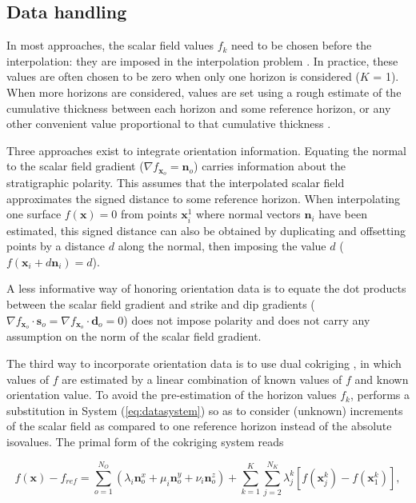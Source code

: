 \documentclass[preprint]{ring20}
\newcommand{\bx}{\mathbf{x}}
\newcommand{\bn}{\mathbf{n}}
\begin{document}
\subsection {Data handling}

In most approaches, the scalar field values $f_k$ need to be chosen before the interpolation: they are imposed in the interpolation problem \citep[e.g., ][]{Frank2007CG,Hillier2014MG,Renaudeau2019MG,Irakarama2022CD}. In practice, these values are often chosen to be zero when only one horizon is considered ($K$ = 1). When more horizons are considered, values are set using a rough estimate of the cumulative thickness between each horizon and some reference horizon, or any other convenient value proportional to that cumulative thickness \citep{Caumon2013GaRSITo,Collon-Drouaillet2015C&G,Collon2016I}. 

Three approaches exist to integrate orientation information. Equating the normal to the scalar field gradient ($\nabla f_{\bx_o} = \mathbf{n}_o$) carries information about the stratigraphic polarity. This assumes that the interpolated scalar field approximates the signed distance to some reference horizon. When interpolating one surface $f(\bx) = 0$ from points $\bx^1_i$ where normal vectors $\mathbf{n}_i$ have been estimated, this signed distance can also be obtained by duplicating and offsetting points by a distance $d$ along the normal, then imposing the value $d$ ($f(\bx_i + d \mathbf{n}_i) = d$). 

A less informative way of honoring orientation data is to equate the dot products between the scalar field gradient and strike and dip gradients ($\nabla f_{\bx_o} \cdot \mathbf{s}_o = \nabla f_{\bx_o} \cdot \mathbf{d}_o = 0$) does not impose polarity and does not carry any assumption on the norm of the scalar field gradient. 

The third way to incorporate orientation data is to use dual cokriging \citep[DcK, ][]{Lajaunie1997MG,Chiles04OMSMP}, in which values of $f$ are estimated by a linear combination of known values of $f$ and known orientation value. To avoid the pre-estimation of the horizon values $f_k$, performs a substitution in System (\ref{eq:datasystem}) so as to consider (unknown) increments of the scalar field as compared to one reference horizon instead of the absolute isovalues. The primal form of the cokriging system reads

\begin{equation}
\label{eq:DcK}
f(\bx) - f_{ref} = \sum_{o=1}^{N_O} (\lambda_i \bn_o^x + \mu_i \bn_o^y + \nu_i \bn_o^z) + \sum_{k=1}^{K} \sum_{j=2}^{N_K} \lambda_{j}^{k}[f(\bx_j^k) - f(\bx_1^k)], 
\end{equation}
\end{document}
